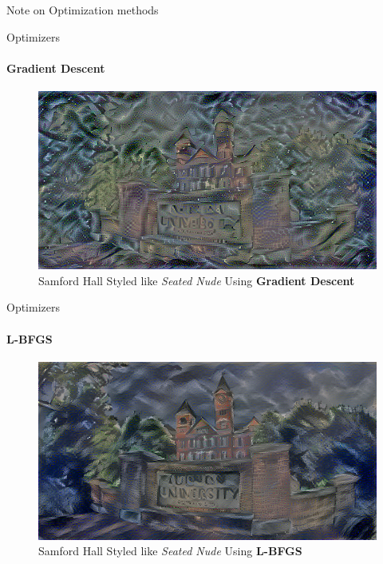 \documentclass{beamer}
\begin{document}
\begin{frame}[allowframebreaks]{Note on Optimization methods}
    \begin{table}[]
        \centering
        \caption*{Minimizing $\mathcal{L}_{total}$ With Different Optimizers}
        \label{my-label}
    \end{table}

\end{frame}



\begin{frame}{Optimizers}
\framesubtitle{Gradient Descent}
\begin{figure}[ht]
\centering
\includegraphics[width=\textwidth]{img/loss/SGD}
\caption*{Samford Hall Styled like \textit{Seated Nude} Using \textbf{Gradient Descent}}
\end{figure}
\end{frame}



\begin{frame}{Optimizers}
\framesubtitle{L-BFGS}
\begin{figure}[ht]
\centering
\includegraphics[width=\textwidth]{img/loss/L_BFGS}
\caption*{Samford Hall Styled like \textit{Seated Nude} Using \textbf{L-BFGS}}
\end{figure}
\end{frame}
\end{document}
